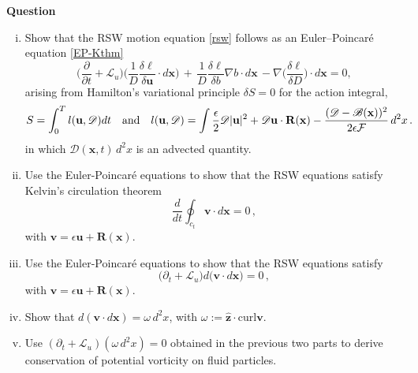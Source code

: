 \documentclass[11pt, oneside]{article}   	%
\numberwithin{equation}{section}
\theoremstyle{plain}
\theoremstyle{definition}
\theoremstyle{remark}
\newcommand{\<}{\langle}
\renewcommand{\>}{\rangle}
\begin{document}
\textbf{Question}
\begin{enumerate}[(i)]
\item
Show that the RSW motion equation \eqref{rsw} follows as an Euler--Poincar\'e equation \eqref{EP-Kthm} 
\[
\Big(\frac{\partial }{\partial t} +  \mathcal{L}_u\Big)
\Big(\frac{1}{D}\frac{\delta \ell}{\delta
\mathbf{u}}\cdot d\mathbf{x}\Big)
\,+\,\frac{1}{D}\frac{\delta \ell}{\delta b}\nabla b \cdot d\mathbf{x}
\,-\nabla\Big(\frac{\delta \ell}{\delta D}\Big)\cdot d\mathbf{x}
 = 0,
\]
%
arising from Hamilton's variational principle $ \delta S=0$ for the action integral,
\begin{align}
S=\int_0^T l(\mathbf{u},\mathscr{D}) dt \quad\hbox{and}\quad 
l(\mathbf{u},\mathscr{D}) = \int \frac{\epsilon}{2}\mathscr{D} |\mathbf{u}|^2 
+ \mathscr{D}\mathbf{u}\cdot\mathbf{R}(\mathbf{x}) - \frac{(\mathscr{D}-\mathscr{B}(\mathbf{x}))^2}{2\epsilon\cal{F}} \,d^2x\,.
\label{rsw-Lag}
\end{align}
in which $\mathscr{D}(\mathbf{x},t)\,d^2x$ is an advected quantity. 

\item
Use the Euler-Poincar\'e equations to show that the RSW equations satisfy Kelvin's circulation theorem
\[
\frac{d}{dt} \oint_{c_t} \mathbf{v} \cdot d \mathbf{x} = 0 \,,
\]
 with $\mathbf{v}=\epsilon \mathbf{u} + \mathbf{R}(\mathbf{x})$.

\item
Use the Euler-Poincar\'e equations to show that the RSW equations satisfy
\[
\big(\partial_t +  \mathcal{L}_u\big) d \big( \mathbf{v} \cdot d \mathbf{x}\big) = 0\,,
\]
 with $\mathbf{v}=\epsilon \mathbf{u} + \mathbf{R}(\mathbf{x})$. 

 \item
Show that $ d (\mathbf{v} \cdot d \mathbf{x}) = \omega \,d^2x$, with $\omega := \mathbf{\hat{z}}\cdot\mathrm{curl}\mathbf{v}$.

 \item
Use $(\partial_t +  \mathcal{L}_u)(\omega \,d^2x)=0$ obtained in the previous two parts to derive conservation of potential vorticity on fluid particles.

\end{enumerate}
\end{document}
